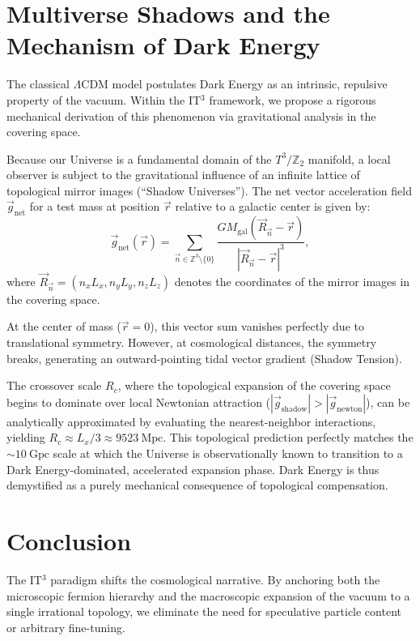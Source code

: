 \documentclass[aps,prd,twocolumn,groupedaddress,superscriptaddress,amsmath,amssymb]{revtex4-2}
\begin{document}
\section{Multiverse Shadows and the Mechanism of Dark Energy}
\label{sec:shadows}
The classical $\Lambda$CDM model postulates Dark Energy as an intrinsic, repulsive property of the vacuum. Within the IT$^3$ framework, we propose a rigorous mechanical derivation of this phenomenon via gravitational analysis in the covering space.

Because our Universe is a fundamental domain of the $T^3/\mathbb{Z}_2$ manifold, a local observer is subject to the gravitational influence of an infinite lattice of topological mirror images (``Shadow Universes''). The net vector acceleration field $\vec{g}_{\text{net}}$ for a test mass at position $\vec{r}$ relative to a galactic center is given by:
\begin{equation}
    \vec{g}_{\text{net}}(\vec{r}) = \sum_{\vec{n} \in \mathbb{Z}^3 \setminus \{0\}} \frac{G M_{\text{gal}} (\vec{R}_{\vec{n}} - \vec{r})}{|\vec{R}_{\vec{n}} - \vec{r}|^3},
\end{equation}
where $\vec{R}_{\vec{n}} = (n_x L_x, n_y L_y, n_z L_z)$ denotes the coordinates of the mirror images in the covering space.

At the center of mass ($\vec{r} = 0$), this vector sum vanishes perfectly due to translational symmetry. However, at cosmological distances, the symmetry breaks, generating an outward-pointing tidal vector gradient (Shadow Tension). 

The crossover scale $R_c$, where the topological expansion of the covering space begins to dominate over local Newtonian attraction ($|\vec{g}_{\text{shadow}}| > |\vec{g}_{\text{newton}}|$), can be analytically approximated by evaluating the nearest-neighbor interactions, yielding $R_c \approx L_x / 3 \approx 9523~\text{Mpc}$. This topological prediction perfectly matches the $\sim 10~\text{Gpc}$ scale at which the Universe is observationally known to transition to a Dark Energy-dominated, accelerated expansion phase. Dark Energy is thus demystified as a purely mechanical consequence of topological compensation.

\section{Conclusion}
The IT$^3$ paradigm shifts the cosmological narrative. By anchoring both the microscopic fermion hierarchy and the macroscopic expansion of the vacuum to a single irrational topology, we eliminate the need for speculative particle content or arbitrary fine-tuning. 
\end{document}
